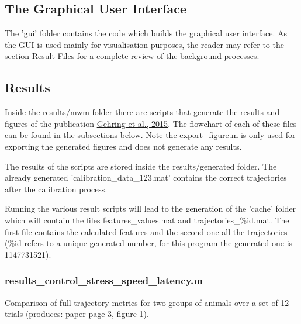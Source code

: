 \documentclass[12pt,titlepage]{article}
\begin{document}
\begin{doublespace}
\subsection{The Graphical User Interface}
The 'gui' folder contains the code which builds the graphical user interface. As the GUI is used mainly for visualisation purposes, the reader may refer to the section Result Files for a complete review of the background processes.

\subsection{Results}
Inside the results$/$mwm folder there are scripts that generate the results and figures of the publication \href{http://www.nature.com/articles/srep14562}{Gehring et al., 2015}. The flowchart of each of these files can be found in the subsections below. Note the export\_figure.m is only used for exporting the generated figures and does not generate any results. 

The results of the scripts are stored inside the results$/$generated folder. The already generated 'calibration\_data\_123.mat' contains the correct trajectories after the calibration process.

Running the various result scripts will lead to the generation of the 'cache' folder which will contain the files features\_values.mat and trajectories\_\%id.mat. The first file contains the calculated features and the second one all the trajectories (\%id refers to a unique generated number, for this program the generated one is 1147731521). 

\subsubsection{results\_control\_stress\_speed\_latency.m}
Comparison of full trajectory metrics for two groups of animals over a set of 12 trials (produces: paper page 3, figure 1).


\end{doublespace}
\end{document}
